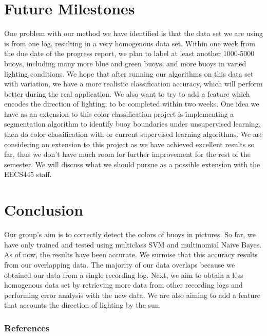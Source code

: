 \documentclass{article} %
\begin{document}
\section{Future Milestones}
One problem with our method we have identified is that the data set we are using is from one log, resulting in a very homogenous data set. Within one week from the due date of the progress report, we plan to label at least another 1000-5000 buoys, including many more blue and green buoys, and more buoys in varied lighting conditions. We hope that after running our algorithms on this data set with variation, we have a more realistic classification accuracy, which will perform better during the real application. We also want to try to add a feature which encodes the direction of lighting, to be completed within two weeks. One idea we have as an extension to this color classification project is implementing a segmentation algorithm to identify buoy boundaries under unsupervised learning, then do color classification with or current supervised learning algorithms. We are considering an extension to this project as we have achieved excellent results so far, thus we don't have much room for further improvement for the rest of the semester. We will discuss what we should pursue as a possible extension with the EECS445 staff. 
 

\section{Conclusion}

Our group's aim is to correctly detect the colors of buoys in pictures. %
So far, we have only trained and tested using multiclass SVM and multinomial Naive Bayes. As of now, the results have been accurate. We surmise that this accuracy results from our overlapping data. The majority of our data overlaps because we obtained our data from a single recording log.  Next, we aim to obtain a less homogenous data set by retrieving more data from other recording logs and performing error analysis with the new data. We are also aiming to add a feature that accounts the direction of lighting by the sun.

\subsubsection*{References}


\end{document}
